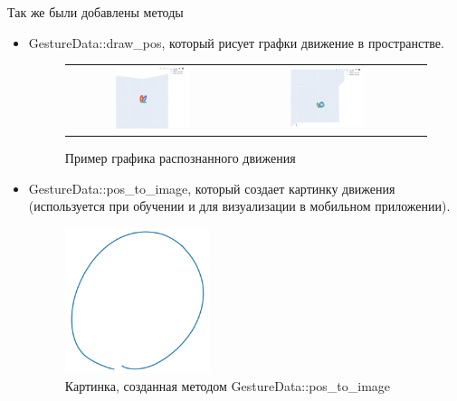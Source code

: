 Так же были добавлены методы
\begin{itemize}
  \item GestureData::draw\_pos, который рисует графки движение в пространстве.
  \begin{figure}[H]
    \begin{center}
        \begin{tabular}{ccc}
            \includegraphics[width=0.45\textwidth]{images/draw_pos_1.png} & 
            \includegraphics[width=0.45\textwidth]{images/draw_pos_2.png} \\
        \end{tabular}
    \end{center}
    \caption{Пример графика распознанного движения}
\end{figure}
  \item GestureData::pos\_to\_image, который создает картинку движения (используется при обучении и для визуализации в мобильном приложении).
  \begin{figure}[H]
    \begin{center}
        \includegraphics[width=0.4\textwidth]{images/pos_to_img_1.png}
    \end{center}
    \caption{Картинка, созданная методом GestureData::pos\_to\_image}
  \end{figure}
\end{itemize}

